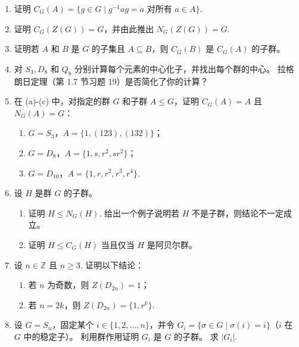 \begin{enumerate}
\item 证明 \( C_G(A) = \{g \in G \mid g^{-1}ag = a \text{ 对所有 } a \in A\} \).

\item 证明 \( C_G(Z(G)) = G \)，并由此推出 \( N_G(Z(G)) = G \).

\item 证明若 \( A \) 和 \( B \) 是 \( G \) 的子集且 \( A \subseteq B \)，则 \( C_G(B) \) 是 \( C_G(A) \) 的子群。

\item 对 \( S_3, D_8 \) 和 \( Q_8 \) 分别计算每个元素的中心化子，并找出每个群的中心。
拉格朗日定理（第 1.7 节习题 19）是否简化了你的计算？

\item 在 (a)-(c) 中，对指定的群 \( G \) 和子群 \( A \leq G \)，证明 \( C_G(A) = A \) 且 \( N_G(A) = G \)：
\begin{enumerate}[label=(\alph*)]
\item \( G = S_3 \)，\( A = \{1, (123), (132)\} \)；
\item \( G = D_8 \)，\( A = \{1, s, r^2, sr^2\} \)；
\item \( G = D_{10} \)，\( A = \{1, r, r^2, r^3, r^4\} \).
\end{enumerate}

\item 设 \( H \) 是群 \( G \) 的子群。
\begin{enumerate}[label=(\alph*)]
\item 证明 \( H \leq N_G(H) \). 
给出一个例子说明若 \( H \) 不是子群，则结论不一定成立。
\item 证明 \( H \leq C_G(H) \) 当且仅当 \( H \) 是阿贝尔群。
\end{enumerate}

\item 设 \( n \in \mathbb{Z} \) 且 \( n \geq 3 \). 
证明以下结论：
\begin{enumerate}[label=(\alph*)]
\item 若 \( n \) 为奇数，则 \( Z(D_{2n}) = 1 \)；
\item 若 \( n = 2k \)，则 \( Z(D_{2n}) = \{1, r^k\} \).
\end{enumerate}

\item 设 \( G = S_n \)，固定某个 \( i \in \{1, 2, \ldots, n\} \)，并令 \( G_i = \{\sigma \in G \mid \sigma(i) = i\} \)（\( i \) 在 \( G \) 中的稳定子）。
利用群作用证明 \( G_i \) 是 \( G \) 的子群。
求 \( |G_i| \).


\end{enumerate}
